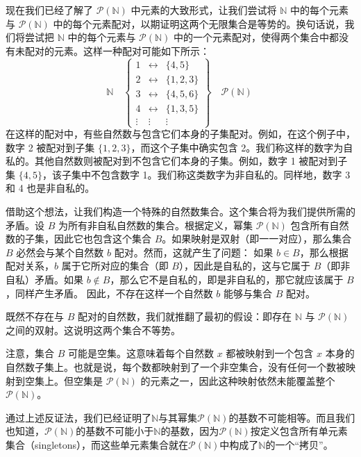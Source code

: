 现在我们已经了解了 $\mathcal{P}(\mathbb{N})$ 中元素的大致形式，让我们尝试将 $\mathbb{N}$ 中的每个元素与 $\mathcal{P}(\mathbb{N})$ 中的每个元素配对，以期证明这两个无限集合是等势的。换句话说，我们将尝试把 $\mathbb{N}$ 中的每个元素与 $\mathcal{P}(\mathbb{N})$ 中的一个元素配对，使得两个集合中都没有未配对的元素。这样一种配对可能如下所示：
$$
\mathbb{N} \quad
\begin{Bmatrix}
1 & \longleftrightarrow & \{4, 5\} \\
2 & \longleftrightarrow & \{1, 2, 3\} \\
3 & \longleftrightarrow & \{4, 5, 6\} \\
4 & \longleftrightarrow & \{1, 3, 5\} \\
\vdots & \vdots & \vdots
\end{Bmatrix}
\quad \mathcal{P}(\mathbb{N})~
$$
在这样的配对中，有些自然数与包含它们本身的子集配对。例如，在这个例子中，数字 2 被配对到子集 $\{1, 2, 3\}$，而这个子集中确实包含 2。我们称这样的数字为自私的。其他自然数则被配对到不包含它们本身的子集。例如，数字 1 被配对到子集 $\{4, 5\}$，该子集中不包含数字 1。我们称这类数字为非自私的。同样地，数字 3 和 4 也是非自私的。

借助这个想法，让我们构造一个特殊的自然数集合。这个集合将为我们提供所需的矛盾。设 $B$ 为所有非自私自然数的集合。根据定义，幂集 $\mathcal{P}(\mathbb{N})$ 包含所有自然数的子集，因此它也包含这个集合 $B$。如果映射是双射（即一一对应），那么集合 $B$ 必然会与某个自然数 $b$ 配对。然而，这就产生了问题： 如果 $b \in B$，那么根据配对关系，$b$ 属于它所对应的集合（即 $B$），因此是自私的，这与它属于 $B$（即非自私）矛盾。如果 $b \notin B$，那么它不是自私的，即是非自私的，那它就应该属于 $B$，同样产生矛盾。
因此，不存在这样一个自然数 $b$ 能够与集合 $B$ 配对。

既然不存在与 $B$ 配对的自然数，我们就推翻了最初的假设：即存在 $\mathbb{N}$ 与 $\mathcal{P}(\mathbb{N})$ 之间的双射。这说明这两个集合不等势。

注意，集合 $B$ 可能是空集。这意味着每个自然数 $x$ 都被映射到一个包含 $x$ 本身的自然数子集上。也就是说，每个数都映射到了一个非空集合，没有任何一个数被映射到空集上。但空集是 $\mathcal{P}(\mathbb{N})$ 的元素之一，因此这种映射依然未能覆盖整个 $\mathcal{P}(\mathbb{N})$。

通过上述反证法，我们已经证明了$\mathbb{N}$与其幂集$\mathcal{P}(\mathbb{N})$的基数不可能相等。而且我们也知道，$\mathcal{P}(\mathbb{N})$的基数不可能小于$\mathbb{N}$的基数，因为$\mathcal{P}(\mathbb{N})$按定义包含所有单元素集合（singletons），而这些单元素集合就在$\mathcal{P}(\mathbb{N})$中构成了$\mathbb{N}$的一个“拷贝”。

